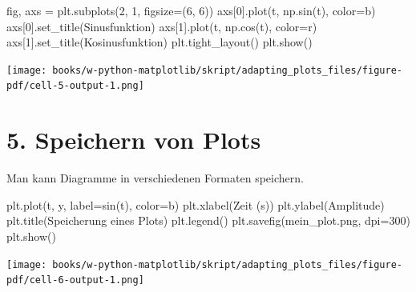 \documentclass[
  letterpaper,
  DIV=11,
  numbers=noendperiod]{scrreprt}
\newenvironment{Shaded}{\begin{snugshade}}{\end{snugshade}}
\newcommand{\DecValTok}[1]{\textcolor[rgb]{0.68,0.00,0.00}{#1}}
\newcommand{\NormalTok}[1]{\textcolor[rgb]{0.00,0.23,0.31}{#1}}
\newcommand{\OperatorTok}[1]{\textcolor[rgb]{0.37,0.37,0.37}{#1}}
\newcommand{\StringTok}[1]{\textcolor[rgb]{0.13,0.47,0.30}{#1}}
\begin{document}
\begin{Shaded}
\begin{Highlighting}[]
\NormalTok{fig, axs }\OperatorTok{=}\NormalTok{ plt.subplots(}\DecValTok{2}\NormalTok{, }\DecValTok{1}\NormalTok{, figsize}\OperatorTok{=}\NormalTok{(}\DecValTok{6}\NormalTok{, }\DecValTok{6}\NormalTok{))}
\NormalTok{axs[}\DecValTok{0}\NormalTok{].plot(t, np.sin(t), color}\OperatorTok{=}\StringTok{\textquotesingle{}b\textquotesingle{}}\NormalTok{)}
\NormalTok{axs[}\DecValTok{0}\NormalTok{].set\_title(}\StringTok{\textquotesingle{}Sinusfunktion\textquotesingle{}}\NormalTok{)}
\NormalTok{axs[}\DecValTok{1}\NormalTok{].plot(t, np.cos(t), color}\OperatorTok{=}\StringTok{\textquotesingle{}r\textquotesingle{}}\NormalTok{)}
\NormalTok{axs[}\DecValTok{1}\NormalTok{].set\_title(}\StringTok{\textquotesingle{}Kosinusfunktion\textquotesingle{}}\NormalTok{)}
\NormalTok{plt.tight\_layout()}
\NormalTok{plt.show()}
\end{Highlighting}
\end{Shaded}

\texttt{[image: books/w-python-matplotlib/skript/adapting\_plots\_files/figure-pdf/cell-5-output-1.png]}

\section{5. Speichern von Plots}\label{speichern-von-plots}

Man kann Diagramme in verschiedenen Formaten speichern.

\begin{Shaded}
\begin{Highlighting}[]
\NormalTok{plt.plot(t, y, label}\OperatorTok{=}\StringTok{\textquotesingle{}sin(t)\textquotesingle{}}\NormalTok{, color}\OperatorTok{=}\StringTok{\textquotesingle{}b\textquotesingle{}}\NormalTok{)}
\NormalTok{plt.xlabel(}\StringTok{\textquotesingle{}Zeit (s)\textquotesingle{}}\NormalTok{)}
\NormalTok{plt.ylabel(}\StringTok{\textquotesingle{}Amplitude\textquotesingle{}}\NormalTok{)}
\NormalTok{plt.title(}\StringTok{\textquotesingle{}Speicherung eines Plots\textquotesingle{}}\NormalTok{)}
\NormalTok{plt.legend()}
\NormalTok{plt.savefig(}\StringTok{\textquotesingle{}mein\_plot.png\textquotesingle{}}\NormalTok{, dpi}\OperatorTok{=}\DecValTok{300}\NormalTok{)}
\NormalTok{plt.show()}
\end{Highlighting}
\end{Shaded}

\texttt{[image: books/w-python-matplotlib/skript/adapting\_plots\_files/figure-pdf/cell-6-output-1.png]}
\end{document}
